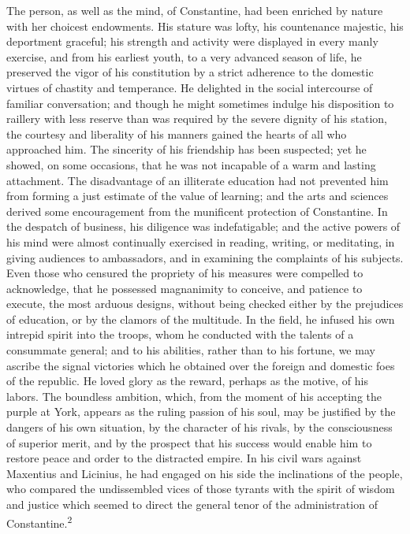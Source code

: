 The person, as well as the mind, of Constantine, had been
enriched by nature with her choicest endowments. His stature was
lofty, his countenance majestic, his deportment graceful; his
strength and activity were displayed in every manly exercise, and
from his earliest youth, to a very advanced season of life, he
preserved the vigor of his constitution by a strict adherence to
the domestic virtues of chastity and temperance. He delighted in
the social intercourse of familiar conversation; and though he
might sometimes indulge his disposition to raillery with less
reserve than was required by the severe dignity of his station,
the courtesy and liberality of his manners gained the hearts of
all who approached him. The sincerity of his friendship has been
suspected; yet he showed, on some occasions, that he was not
incapable of a warm and lasting attachment. The disadvantage of
an illiterate education had not prevented him from forming a just
estimate of the value of learning; and the arts and sciences
derived some encouragement from the munificent protection of
Constantine. In the despatch of business, his diligence was
indefatigable; and the active powers of his mind were almost
continually exercised in reading, writing, or meditating, in
giving audiences to ambassadors, and in examining the complaints
of his subjects. Even those who censured the propriety of his
measures were compelled to acknowledge, that he possessed
magnanimity to conceive, and patience to execute, the most
arduous designs, without being checked either by the prejudices
of education, or by the clamors of the multitude. In the field,
he infused his own intrepid spirit into the troops, whom he
conducted with the talents of a consummate general; and to his
abilities, rather than to his fortune, we may ascribe the signal
victories which he obtained over the foreign and domestic foes of
the republic. He loved glory as the reward, perhaps as the
motive, of his labors. The boundless ambition, which, from the
moment of his accepting the purple at York, appears as the ruling
passion of his soul, may be justified by the dangers of his own
situation, by the character of his rivals, by the consciousness
of superior merit, and by the prospect that his success would
enable him to restore peace and order to the distracted empire.
In his civil wars against Maxentius and Licinius, he had engaged
on his side the inclinations of the people, who compared the
undissembled vices of those tyrants with the spirit of wisdom and
justice which seemed to direct the general tenor of the
administration of Constantine.\textsuperscript{2}


